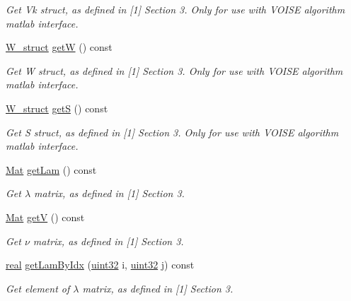 \begin{DoxyCompactItemize}
\begin{DoxyCompactList}\small\item\em Get Vk struct, as defined in \mbox{[}1\mbox{]} Section 3. Only for use with V\+O\+I\+SE algorithm matlab interface. \end{DoxyCompactList}\item 
\mbox{\hyperlink{structW__struct}{W\+\_\+struct}} \mbox{\hyperlink{classvd_ab4d0d9ea76cedf1a6825b62c9ec2d118}{getW}} () const
\begin{DoxyCompactList}\small\item\em Get W struct, as defined in \mbox{[}1\mbox{]} Section 3. Only for use with V\+O\+I\+SE algorithm matlab interface. \end{DoxyCompactList}\item 
\mbox{\hyperlink{structW__struct}{W\+\_\+struct}} \mbox{\hyperlink{classvd_a7f901e0c6d226b81f262c2363a69844a}{getS}} () const
\begin{DoxyCompactList}\small\item\em Get S struct, as defined in \mbox{[}1\mbox{]} Section 3. Only for use with V\+O\+I\+SE algorithm matlab interface. \end{DoxyCompactList}\item 
\mbox{\hyperlink{typedefs_8h_a9fa28c1f74e909474857584f5c7b0088}{Mat}} \mbox{\hyperlink{classvd_a37c4ab12669eb276fe7fa4a610310345}{get\+Lam}} () const
\begin{DoxyCompactList}\small\item\em Get $\lambda$ matrix, as defined in \mbox{[}1\mbox{]} Section 3. \end{DoxyCompactList}\item 
\mbox{\hyperlink{typedefs_8h_a9fa28c1f74e909474857584f5c7b0088}{Mat}} \mbox{\hyperlink{classvd_aad4ea5c045b8380f83b0490af2fee0fa}{getV}} () const
\begin{DoxyCompactList}\small\item\em Get $\nu$ matrix, as defined in \mbox{[}1\mbox{]} Section 3. \end{DoxyCompactList}\item 
\mbox{\hyperlink{typedefs_8h_a58a0c7cf2501f4492da833421be92547}{real}} \mbox{\hyperlink{classvd_a5c26b069f893aa82eeaf53ff608eda1f}{get\+Lam\+By\+Idx}} (\mbox{\hyperlink{typedefs_8h_a8ad23e2333787a214e20a58a284a5a60}{uint32}} i, \mbox{\hyperlink{typedefs_8h_a8ad23e2333787a214e20a58a284a5a60}{uint32}} j) const
\begin{DoxyCompactList}\small\item\em Get element of $\lambda$ matrix, as defined in \mbox{[}1\mbox{]} Section 3. \end{DoxyCompactList}\item 

\end{DoxyCompactItemize}
